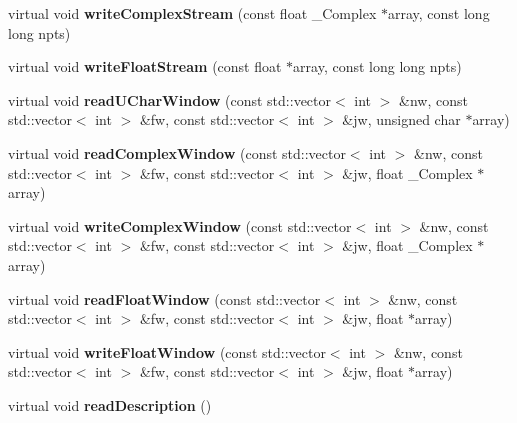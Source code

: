 \begin{DoxyCompactItemize}
virtual void {\bfseries write\+Complex\+Stream} (const float \+\_\+\+Complex $\ast$array, const long long npts)
\item 
\mbox{\label{classrsf_reg_file_a164920452ea42131b388466a877b8d23}} 
virtual void {\bfseries write\+Float\+Stream} (const float $\ast$array, const long long npts)
\item 
\mbox{\label{classrsf_reg_file_a9a9d0de9f90bcef320e11f4f603595bb}} 
virtual void {\bfseries read\+U\+Char\+Window} (const std\+::vector$<$ int $>$ \&nw, const std\+::vector$<$ int $>$ \&fw, const std\+::vector$<$ int $>$ \&jw, unsigned char $\ast$array)
\item 
\mbox{\label{classrsf_reg_file_a931849276b42572ed29a0e2f4b647c5c}} 
virtual void {\bfseries read\+Complex\+Window} (const std\+::vector$<$ int $>$ \&nw, const std\+::vector$<$ int $>$ \&fw, const std\+::vector$<$ int $>$ \&jw, float \+\_\+\+Complex $\ast$array)
\item 
\mbox{\label{classrsf_reg_file_aab1180b306c0bcb86a9c9612ced60fa3}} 
virtual void {\bfseries write\+Complex\+Window} (const std\+::vector$<$ int $>$ \&nw, const std\+::vector$<$ int $>$ \&fw, const std\+::vector$<$ int $>$ \&jw, float \+\_\+\+Complex $\ast$array)
\item 
\mbox{\label{classrsf_reg_file_aa0791c6435cc472460d867d958f9cedd}} 
virtual void {\bfseries read\+Float\+Window} (const std\+::vector$<$ int $>$ \&nw, const std\+::vector$<$ int $>$ \&fw, const std\+::vector$<$ int $>$ \&jw, float $\ast$array)
\item 
\mbox{\label{classrsf_reg_file_af48ee2663b87b1221c92193a8a45915f}} 
virtual void {\bfseries write\+Float\+Window} (const std\+::vector$<$ int $>$ \&nw, const std\+::vector$<$ int $>$ \&fw, const std\+::vector$<$ int $>$ \&jw, float $\ast$array)
\item 
\mbox{\label{classrsf_reg_file_a1e1c6014388babec8f0ae46a5332e794}} 
virtual void {\bfseries read\+Description} ()
\item 
\mbox{\label{classrsf_reg_file_a6d61905f0c3dd4a17b0d1daf37bd1c71}} 

\end{DoxyCompactItemize}
